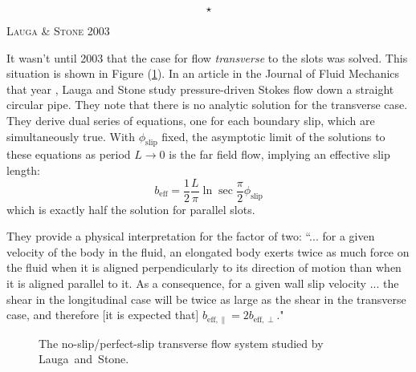 \documentclass[12pt, a4paper, twoside, openright]{book}
\newcommand{\beff}{\ensuremath{b_{\mathrm{eff}}}}
\newcommand{\phislip}{\ensuremath{\phi_{\mathrm{slip}}}}
\newcommand{\sep}{\begin{equation*} \star \end{equation*}}
\newcommand{\paper}[1]
         {\colorbox[gray]{0.8}{ \textsc{#1}}
         
         }
\begin{document}
\sep
\clearpage

\paper{Lauga \& Stone 2003}
It wasn't until 2003 that the case for flow \emph{transverse} to the slots was solved.  
This situation is shown in Figure (\ref{LaugaStone}).
In an article in the Journal of Fluid Mechanics that year \cite{LaugaStone2003}, Lauga and Stone study pressure-driven Stokes flow down a straight circular pipe.  They note that there is no analytic solution for the transverse case.  They derive dual series of equations, one for each boundary slip, which are simultaneously true.
With $\phislip$ fixed, the asymptotic limit of the solutions to these equations as period $L \rightarrow 0$ is the far field flow, implying an effective slip length:
\begin{equation}
\beff= \frac{1}{2} \frac{L}{\pi}	\ln \sec \frac{\pi}{2} \phislip
\end{equation}
which is exactly half the solution for parallel slots.

They provide a physical interpretation for the factor of two: ``... for a given velocity of the body in the fluid, an elongated body exerts twice as much force on the fluid when it is aligned perpendicularly to its direction of motion than when it is aligned parallel to it. As a consequence, for a given wall slip velocity ... the shear in the longitudinal case will be twice as large as the shear in the transverse case, and therefore [it is expected that] 
$b_{\mathrm{eff,} \parallel } = 2 b_{\mathrm{eff,} \perp }  $."

\begin{figure}[ht]
\centering
{}
\caption{The no-slip/perfect-slip transverse flow system studied by Lauga~and~Stone.} \label{LaugaStone}
\end{figure}
\end{document}
